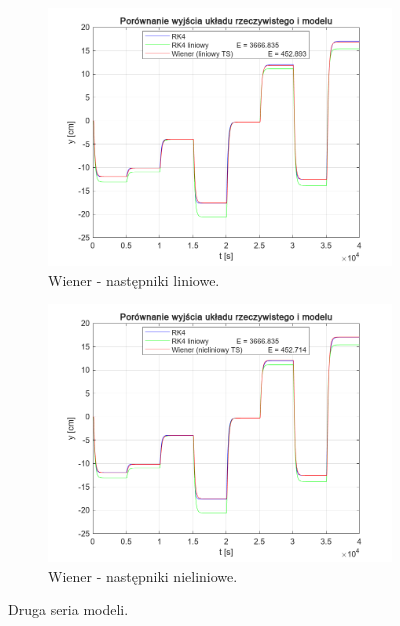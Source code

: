 \begin{figure}[b!]
\begin{subfigure}[b]{0.49\paperwidth}
\centering
\includegraphics[width=\linewidth]{pictures/WienerLinearModel_2}
\caption{Wiener - następniki liniowe.}
\end{subfigure}
\hfill
\begin{subfigure}[b]{0.49\paperwidth}
\centering
\includegraphics[width=\linewidth]{pictures/WienerNonlinearModel_2}
\caption{Wiener - następniki nieliniowe.}
\end{subfigure}

\caption{Druga seria modeli.}
\end{figure}

\newpage

